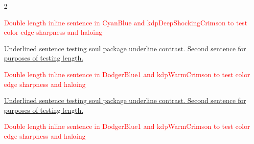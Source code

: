 \begin{multicols}{2}
\par\noindent\textcolor{Red}{Double length inline sentence in CyanBlue and kdpDeepShockingCrimson to test color edge sharpness and haloing}
\clearpage
{}
\par\noindent\ul{Underlined sentence testing soul package underline contrast. Second sentence for purposes of testing length.}
\par\noindent\textcolor{Red}{Double length inline sentence in DodgerBlue1 and kdpWarmCrimson to test color edge sharpness and haloing}
\clearpage
{}
\par\noindent\ul{Underlined sentence testing soul package underline contrast. Second sentence for purposes of testing length.}
\par\noindent\textcolor{Red}{Double length inline sentence in DodgerBlue1 and kdpWarmCrimson to test color edge sharpness and haloing}
\clearpage








\end{multicols}
